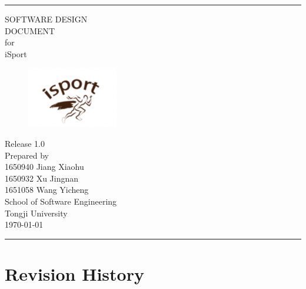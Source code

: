 \documentclass[16pt]{scrreprt}
\date{}
\def\myversion{1.0}
\begin{document}
\begin{flushright}
	\rule{16cm}{5pt}\vskip1cm
	\Huge{SOFTWARE DESIGN\\ DOCUMENT}\\
	\vspace{0.3cm}
	for\\
	\vspace{0.4cm}
	iSport\\
	\begin{figure}[H]
		\flushright
  		\includegraphics[width=.2\textwidth]{diagrams/logo.png}
		\end{figure}
	\normalsize{Release \myversion \\}
	\vspace{1cm}
	Prepared by\vspace{0.5cm} \\ 
        \normalsize{1650940 Jiang Xiaohu\\1650932 Xu Jingnan\\1651058 Wang Yicheng}
        \\
        \vspace{1.1cm}
        \normalsize{School of Software Engineering\\ Tongji University}\\
        \vspace{1.0cm}
        \today
	\vfill
	\rule{16cm}{5pt}
\end{flushright}

\tableofcontents

\chapter*{Revision History}
\end{document}
